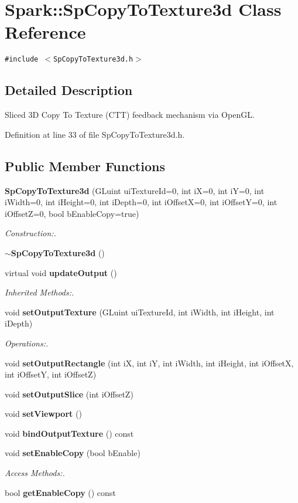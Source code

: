 \section{Spark::Sp\-Copy\-To\-Texture3d Class Reference}
\label{classSpark_1_1SpCopyToTexture3d}
{\tt \#include $<$Sp\-Copy\-To\-Texture3d.h$>$}



\subsection{Detailed Description}
Sliced 3D Copy To Texture (CTT) feedback mechanism via Open\-GL. 

Definition at line 33 of file Sp\-Copy\-To\-Texture3d.h.\subsection*{Public Member Functions}
\begin{CompactItemize}
\item 
{\bf Sp\-Copy\-To\-Texture3d} (GLuint ui\-Texture\-Id=0, int i\-X=0, int i\-Y=0, int i\-Width=0, int i\-Height=0, int i\-Depth=0, int i\-Offset\-X=0, int i\-Offset\-Y=0, int i\-Offset\-Z=0, bool b\-Enable\-Copy=true)
\begin{CompactList}\small\item\em Construction:. \item\end{CompactList}\item 
{\bf $\sim$Sp\-Copy\-To\-Texture3d} ()
\item 
virtual void {\bf update\-Output} ()
\begin{CompactList}\small\item\em Inherited Methods:. \item\end{CompactList}\item 
void {\bf set\-Output\-Texture} (GLuint ui\-Texture\-Id, int i\-Width, int i\-Height, int i\-Depth)
\begin{CompactList}\small\item\em Operations:. \item\end{CompactList}\item 
void {\bf set\-Output\-Rectangle} (int i\-X, int i\-Y, int i\-Width, int i\-Height, int i\-Offset\-X, int i\-Offset\-Y, int i\-Offset\-Z)
\item 
void {\bf set\-Output\-Slice} (int i\-Offset\-Z)
\item 
void {\bf set\-Viewport} ()
\item 
void {\bf bind\-Output\-Texture} () const
\item 
void {\bf set\-Enable\-Copy} (bool b\-Enable)
\begin{CompactList}\small\item\em Access Methods:. \item\end{CompactList}\item 
bool {\bf get\-Enable\-Copy} () const
\end{CompactItemize}
